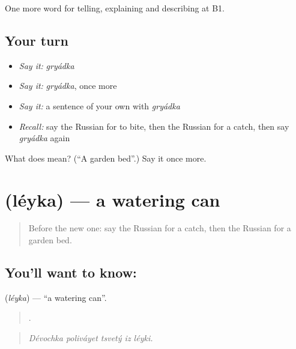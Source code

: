 \begin{grammarlens}[title={What you've built}]
One more word for telling, explaining and describing at B1.
\end{grammarlens}

\subsection*{Your turn}
\begin{itemize}
\raggedright
  \item \emph{Say it:} \emph{gryádka}
  \item \emph{Say it:} \emph{gryádka}, once more
  \item \emph{Say it:} a sentence of your own with \emph{gryádka}
  \item \emph{Recall:} say the Russian for to bite, then the Russian for a catch, then say \emph{gryádka} again
\end{itemize}

\begin{tcolorbox}[breakable,colback=teal!4,colframe=teal!35!black,title={Before you move on}]
What does  mean? (\textquotedblleft{}A garden bed\textquotedblright{}.) Say it once more.
\end{tcolorbox}
\section[\texorpdfstring{\ru{лейка} (léyka)}{лейка (léyka)}]{ (léyka) — a watering can}

\label{lesson:RU-C506-leyka}



\begin{quote}
Before the new one: say the Russian for a catch, then the Russian for a garden bed.
\end{quote}

\subsection*{You'll want to know: }
\textbf{} (\emph{léyka}) — \textquotedblleft{}a watering can\textquotedblright{}.

\begin{quote}
    .
\end{quote}

\begin{quote}
\emph{Dévochka poliváyet tsvetý iz léyki.}
\end{quote}

